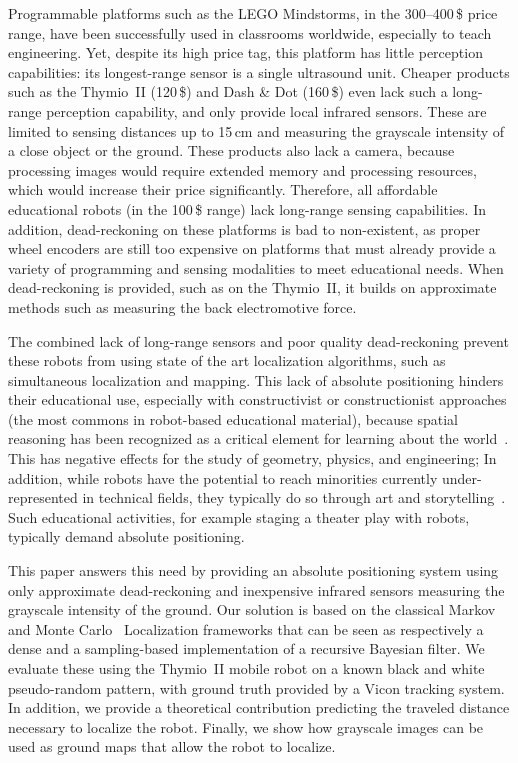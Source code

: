 \documentclass[letterpaper, 10pt, conference]{ieeeconf}
\begin{document}
Programmable platforms such as the LEGO Mindstorms, in the 300--400\,\$ price range, have been successfully used in classrooms worldwide, especially to teach engineering.
Yet, despite its high price tag, this platform has little perception capabilities: its longest-range sensor is a single ultrasound unit.
Cheaper products such as the Thymio~II (120\,\$) and Dash \& Dot (160\,\$) even lack such a long-range perception capability, and only provide local infrared sensors.
These are limited to sensing distances up to 15\,cm and measuring the grayscale intensity of a close object or the ground.
These products also lack a camera, because processing images would require extended memory and processing resources, which would increase their price significantly.
Therefore, all affordable educational robots (in the 100\,\$ range) lack long-range sensing capabilities.
In addition, dead-reckoning on these platforms is bad to non-existent, as proper wheel encoders are still too expensive on platforms that must already provide a variety of programming and sensing modalities to meet educational needs.
When dead-reckoning is provided, such as on the Thymio~II, it builds on approximate methods such as measuring the back electromotive force.

The combined lack of long-range sensors and poor quality dead-reckoning prevent these robots from using state of the art localization algorithms, such as simultaneous localization and mapping.
This lack of absolute positioning hinders their educational use, especially with constructivist or constructionist approaches (the most commons in robot-based educational material), because spatial reasoning has been recognized as a critical element for learning about the world~\cite{lesh2003beyond}.
This has negative effects for the study of geometry, physics, and engineering;
In addition, while robots have the potential to reach minorities currently under-represented in technical fields, they typically do so through art and storytelling~\cite{szecsei2015girls}.
Such educational activities, for example staging a theater play with robots, typically demand absolute positioning.

This paper answers this need by providing an absolute positioning system using only approximate dead-reckoning and inexpensive infrared sensors measuring the grayscale intensity of the ground.
Our solution is based on the classical Markov~\cite{fox1999markov} and Monte Carlo~\cite{dellaert1999monte} Localization frameworks that can be seen as respectively a dense and a sampling-based implementation of a recursive Bayesian filter.
We evaluate these using the Thymio~II mobile robot on a known black and white pseudo-random pattern, with ground truth provided by a Vicon tracking system.
In addition, we provide a theoretical contribution predicting the traveled distance necessary to localize the robot.
Finally, we show how grayscale images can be used as ground maps that allow the robot to localize.
\end{document}
